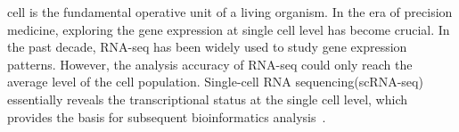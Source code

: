\documentclass[10pt,journal,compsoc]{IEEEtran}
\begin{document}
%
\IEEEpeerreviewmaketitle



% 
% 
% 
% 


 cell is the fundamental operative unit of a living organism. In the era of precision medicine, exploring the gene expression at single cell level has become crucial. In the past decade, RNA-seq has been widely used to study gene expression patterns. However, the analysis accuracy of RNA-seq could only reach the average level of the cell population.  Single-cell RNA sequencing(scRNA-seq) essentially reveals the transcriptional status at the single cell level, which provides the basis for subsequent bioinformatics analysis~\cite{Papalexi2018SinglecellRS}. 
\end{document}
